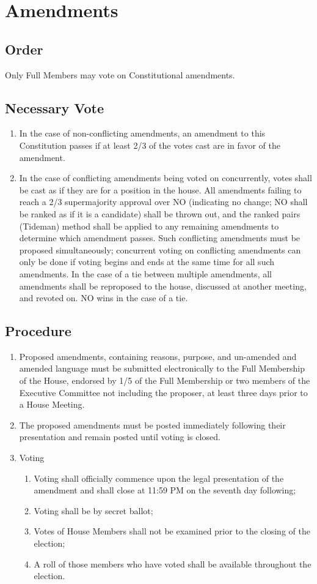 \documentclass[10pt]{article} %
\begin{document}
\section{Amendments}
\subsection{Order}
Only Full Members may vote on Constitutional amendments.
\subsection{Necessary Vote}
\begin{enumerate}
\item In the case of non-conflicting amendments, an amendment to this Constitution passes if at least 2/3 of the votes cast are in favor of the amendment.
\item In the case of conflicting amendments being voted on concurrently, votes shall be cast as if they are for a position in the house. All amendments failing to reach a 2/3 supermajority approval over NO (indicating no change; NO shall be ranked as if it is a candidate) shall be thrown out, and the ranked pairs (Tideman) method shall be applied to any remaining amendments to determine which amendment passes. Such conflicting amendments must be proposed simultaneously; concurrent voting on conflicting amendments can only be done if voting begins and ends at the same time for all such amendments. In the case of a tie between multiple amendments, all amendments shall be reproposed to the house, discussed at another meeting, and revoted on. NO wins in the case of a tie.
\end{enumerate}
\subsection{Procedure}
\begin{enumerate}
\item Proposed amendments, containing reasons, purpose, and un-amended and amended language must be submitted electronically to the Full Membership of the House, endorsed by 1/5 of the Full Membership or two members of the Executive Committee not including the proposer, at least three days prior to a House Meeting.
\item The proposed amendments must be posted immediately following their presentation and remain posted until voting is closed.
\item Voting
\begin{enumerate}
\item Voting shall officially commence upon the legal presentation of the amendment and shall close at 11:59 PM on the seventh day following;
\item Voting shall be by secret ballot;
\item Votes of House Members shall not be examined prior to the closing of the election;
\item A roll of those members who have voted shall be available throughout the election.
\end{enumerate}
\end{enumerate}
\end{document}
